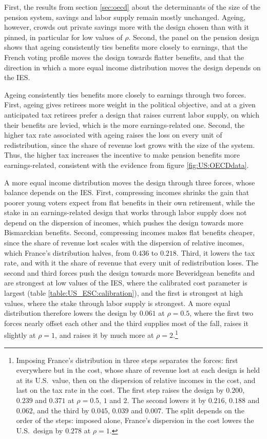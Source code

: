 First, the results from section \ref{sec:oecd} about the determinants of the size of the pension system, savings and labor supply remain mostly unchanged. Ageing, however, crowds out private savings more with the design chosen than with it pinned, in particular for low values of $\rho$. Second, the panel on the pension design shows that ageing consistently ties benefits more closely to earnings, that the French voting profile moves the design towards flatter benefits, and that the direction in which a more equal income distribution moves the design depends on the IES.

Ageing consistently ties benefits more closely to earnings through two forces. First, ageing gives retirees more weight in the political objective, and at a given anticipated tax retirees prefer a design that raises current labor supply, on which their benefits are levied, which is the more earnings-related one. Second, the higher tax rate associated with ageing raises the loss on every unit of redistribution, since the share of revenue lost grows with the size of the system. Thus, the higher tax increases the incentive to make pension benefits more earnings-related, consistent with the evidence from figure \ref{fig:US:OECDdata}.


A more equal income distribution moves the design through three forces, whose balance depends on the IES. First, compressing incomes shrinks the gain that poorer young voters expect from flat benefits in their own retirement, while the stake in an earnings-related design that works through labor supply does not depend on the dispersion of incomes, which pushes the design towards more Bismarckian benefits. Second, compressing incomes makes flat benefits cheaper, since the share of revenue lost scales with the dispersion of relative incomes, which France's distribution halves, from $0.436$ to $0.218$. Third, it lowers the tax rate, and with it the share of revenue that every unit of redistribution loses. The second and third forces push the design towards more Beveridgean benefits and are strongest at low values of the IES, where the calibrated cost parameter is largest (table \ref{table:US_ESC:calibration}), and the first is strongest at high values, where the stake through labor supply is strongest. A more equal distribution therefore lowers the design by $0.061$ at $\rho = 0.5$, where the first two forces nearly offset each other and the third supplies most of the fall, raises it slightly at $\rho = 1$, and raises it by much more at $\rho = 2$.\footnote{Imposing France's distribution in three steps separates the forces: first everywhere but in the cost, whose share of revenue lost at each design is held at its U.S.\ value, then on the dispersion of relative incomes in the cost, and last on the tax rate in the cost. The first step raises the design by $0.200$, $0.239$ and $0.371$ at $\rho = 0.5$, $1$ and $2$. The second lowers it by $0.216$, $0.188$ and $0.062$, and the third by $0.045$, $0.039$ and $0.007$. The split depends on the order of the steps: imposed alone, France's dispersion in the cost lowers the U.S.\ design by $0.278$ at $\rho = 1$.}


